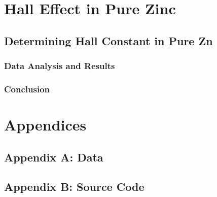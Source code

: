 \documentclass[a4paper]{article}
\begin{document}
\section{Hall Effect in Pure Zinc}

\subsection{Determining Hall Constant in Pure Zn}

\subsubsection{Data Analysis and Results}

\subsubsection{Conclusion}

\section{Appendices}

\subsection{Appendix A: Data}

\subsection{Appendix B: Source Code}
\end{document}
